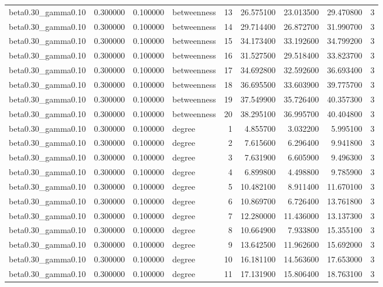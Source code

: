 \begin{tabular}{lrrlrrrrr}
beta0.30\_gamma0.10 & 0.300000 & 0.100000 & betweenness & 13 & 26.575100 & 23.013500 & 29.470800 & 3 \\
beta0.30\_gamma0.10 & 0.300000 & 0.100000 & betweenness & 14 & 29.714400 & 26.872700 & 31.990700 & 3 \\
beta0.30\_gamma0.10 & 0.300000 & 0.100000 & betweenness & 15 & 34.173400 & 33.192600 & 34.799200 & 3 \\
beta0.30\_gamma0.10 & 0.300000 & 0.100000 & betweenness & 16 & 31.527500 & 29.518400 & 33.823700 & 3 \\
beta0.30\_gamma0.10 & 0.300000 & 0.100000 & betweenness & 17 & 34.692800 & 32.592600 & 36.693400 & 3 \\
beta0.30\_gamma0.10 & 0.300000 & 0.100000 & betweenness & 18 & 36.695500 & 33.603900 & 39.775700 & 3 \\
beta0.30\_gamma0.10 & 0.300000 & 0.100000 & betweenness & 19 & 37.549900 & 35.726400 & 40.357300 & 3 \\
beta0.30\_gamma0.10 & 0.300000 & 0.100000 & betweenness & 20 & 38.295100 & 36.995700 & 40.404800 & 3 \\
beta0.30\_gamma0.10 & 0.300000 & 0.100000 & degree & 1 & 4.855700 & 3.032200 & 5.995100 & 3 \\
beta0.30\_gamma0.10 & 0.300000 & 0.100000 & degree & 2 & 7.615600 & 6.296400 & 9.941800 & 3 \\
beta0.30\_gamma0.10 & 0.300000 & 0.100000 & degree & 3 & 7.631900 & 6.605900 & 9.496300 & 3 \\
beta0.30\_gamma0.10 & 0.300000 & 0.100000 & degree & 4 & 6.899800 & 4.498800 & 9.785900 & 3 \\
beta0.30\_gamma0.10 & 0.300000 & 0.100000 & degree & 5 & 10.482100 & 8.911400 & 11.670100 & 3 \\
beta0.30\_gamma0.10 & 0.300000 & 0.100000 & degree & 6 & 10.869700 & 6.726400 & 13.761800 & 3 \\
beta0.30\_gamma0.10 & 0.300000 & 0.100000 & degree & 7 & 12.280000 & 11.436000 & 13.137300 & 3 \\
beta0.30\_gamma0.10 & 0.300000 & 0.100000 & degree & 8 & 10.664900 & 7.933800 & 15.355100 & 3 \\
beta0.30\_gamma0.10 & 0.300000 & 0.100000 & degree & 9 & 13.642500 & 11.962600 & 15.692000 & 3 \\
beta0.30\_gamma0.10 & 0.300000 & 0.100000 & degree & 10 & 16.181100 & 14.563600 & 17.653000 & 3 \\
beta0.30\_gamma0.10 & 0.300000 & 0.100000 & degree & 11 & 17.131900 & 15.806400 & 18.763100 & 3 \\

\end{tabular}
